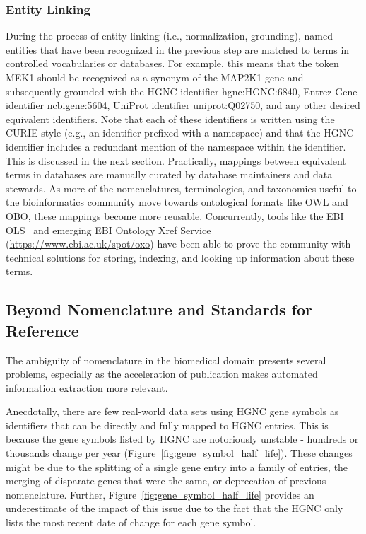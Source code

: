 \subsubsection*{Entity Linking}

During the process of entity linking (i.e., normalization, grounding), named entities that have been recognized in the previous step are matched to terms in controlled vocabularies or databases.
For example, this means that the token MEK1 should be recognized as a synonym of the MAP2K1 gene and subsequently grounded with the \ac{HGNC} identifier hgnc:HGNC:6840, Entrez Gene identifier ncbigene:5604, UniProt identifier uniprot:Q02750, and any other desired equivalent identifiers.
Note that each of these identifiers is written using the \ac{CURIE} style (e.g., an identifier prefixed with a namespace) and that the \ac{HGNC} identifier includes a redundant mention of the namespace within the identifier.
This is discussed in the next section.
Practically, mappings between equivalent terms in databases are manually curated by database maintainers and data stewards.
As more of the nomenclatures, terminologies, and taxonomies useful to the bioinformatics community move towards ontological formats like OWL and OBO, these mappings become more reusable.
Concurrently, tools like the \ac{EBI} \ac{OLS}~\cite{Cote2006} and emerging \ac{EBI} Ontology Xref Service (\url{https://www.ebi.ac.uk/spot/oxo}) have been able to prove the community with technical solutions for storing, indexing, and looking up information about these terms.

\subsection{Beyond Nomenclature and Standards for Reference}

The ambiguity of nomenclature in the biomedical domain presents several problems, especially as the acceleration of publication makes automated information extraction more relevant.

Anecdotally, there are few real-world data sets using \ac{HGNC} gene symbols as identifiers that can be directly and fully mapped to \ac{HGNC} entries.
This is because the gene symbols listed by \ac{HGNC} are notoriously unstable - hundreds or thousands change per year (Figure~\ref{fig:gene_symbol_half_life}).
These changes might be due to the splitting of a single gene entry into a family of entries, the merging of disparate genes that were the same, or deprecation of previous nomenclature.
Further, Figure~\ref{fig:gene_symbol_half_life} provides an underestimate of the impact of this issue due to the fact that the \ac{HGNC} only lists the most recent date of change for each gene symbol.

